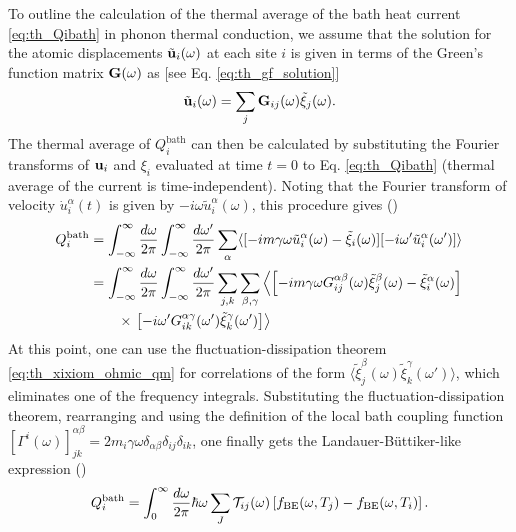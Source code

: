 To outline the calculation of the thermal average of the bath heat current \eqref{eq:th_Qibath} in phonon thermal conduction, we assume that the solution for the atomic displacements $\tilde{\mathbf{u}}_i(\omega)$ at each site $i$ is given in terms of the Green's function matrix $\mathbf{G}(\omega)$ as [see Eq. \eqref{eq:th_gf_solution}]
\begin{equation}
 \tilde{\mathbf{u}}_i(\omega) = \sum_{j} \mathbf{G}_{ij}(\omega) \tilde{\xi}_j(\omega).
\end{equation}
The thermal average of $Q_i^{\textrm{bath}}$ can then be calculated by substituting the Fourier transforms of $\mathbf{u}_i$ and $\xi_i$ evaluated at time $t=0$ to Eq. \eqref{eq:th_Qibath} (thermal average of the current is time-independent). Noting that the Fourier transform of velocity $\dot{u}_i^{\alpha}(t)$ is given by $-i\omega \tilde{u}^{\alpha}_i(\omega)$, this procedure gives ()
\begin{alignat}{2}
 Q_i^{\textrm{bath}}  &= \int_{-\infty}^{\infty} \frac{d\omega}{2\pi} \int_{-\infty}^{\infty} \frac{d\omega'}{2\pi} \sum_{\alpha} \langle  [ -im\gamma\omega \tilde u_i^{\alpha}(\omega)-\tilde \xi_i(\omega)][-i\omega' \tilde u_i^{\alpha}(\omega')] \rangle \\
  &= \int_{-\infty}^{\infty} \frac{d\omega}{2\pi} \int_{-\infty}^{\infty} \frac{d\omega'}{2\pi} \sum_{j,k} \sum_{\beta,\gamma} \left\langle \left[ -im\gamma\omega G_{ij}^{\alpha\beta}(\omega)\tilde \xi_j^{\beta}(\omega)-\tilde \xi_i^{\alpha}(\omega) \right] \right. \notag \\
  &\qquad \times \left.\left[-i\omega' G_{ik}^{\alpha\gamma}(\omega') \tilde \xi_k^{\gamma}(\omega') \right]  \right\rangle
\end{alignat}
At this point, one can use the fluctuation-dissipation theorem \eqref{eq:th_xixiom_ohmic_qm} for correlations of the form $\langle \tilde \xi_j^{\beta}(\omega)\tilde \xi_k^{\gamma}(\omega') \rangle$, which eliminates one of the frequency integrals. Substituting the fluctuation-dissipation theorem, rearranging and using the definition of the local bath coupling function $[\Gamma^i(\omega)]_{jk}^{\alpha\beta}=2m_i\gamma\omega \delta_{\alpha\beta}\delta_{ij} \delta_{ik}$, one finally gets the Landauer-B\"uttiker-like \cite{landauer57,buttiker92} expression ()
\begin{equation}
  Q_i^{\textrm{bath}} = \int_0^{\infty} \frac{d\omega}{2\pi} \hbar \omega  \sum_J \mathcal{T}_{ij}(\omega) \left[ f_{\textrm{BE}}(\omega,T_j)- f_{\textrm{BE}}(\omega,T_i)\right]. \label{eq:th_QI}
\end{equation}
